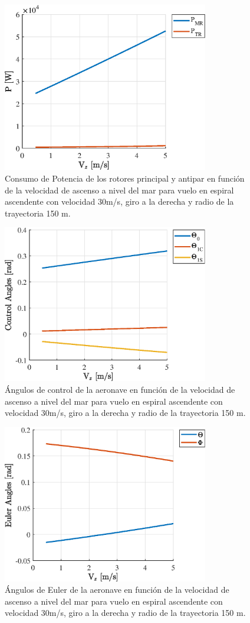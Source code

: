 \begin{figure}
	\centering
	\includegraphics[width=90mm]{graficos/PVEVz}
	\caption{Consumo de Potencia de los rotores principal y antipar en función de la velocidad de ascenso a nivel del mar para vuelo en espiral ascendente con velocidad 30m/s, giro a la derecha y radio de la trayectoria 150 m.}
	\label{PVEVz}
\end{figure}
\begin{figure}
	\centering
	\includegraphics[width=90mm]{graficos/ControlVEVz}
	\caption{Ángulos de control de la aeronave en función de la velocidad de ascenso a nivel del mar para vuelo en espiral ascendente con velocidad 30m/s, giro a la derecha y radio de la trayectoria 150 m.}
	\label{ControlVEVz}
\end{figure}
\begin{figure}
	\centering
	\includegraphics[width=90mm]{graficos/EulerVEVz}
	\caption{Ángulos de Euler de la aeronave en función de la velocidad de ascenso a nivel del mar para vuelo en espiral ascendente con velocidad 30m/s, giro a la derecha y radio de la trayectoria 150 m.}
	\label{EulerVEVz}
\end{figure}

